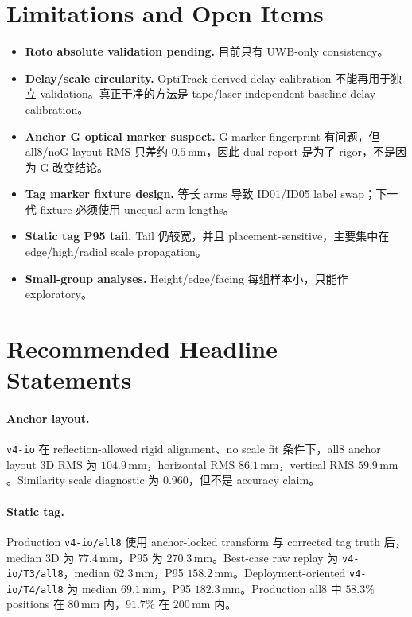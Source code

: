 \documentclass[11pt,a4paper]{article}
\newcommand{\mm}{\,\si{\milli\meter}}
\begin{document}
\section{Limitations and Open Items}
\label{sec:limits}

\begin{itemize}[leftmargin=1.4em]
  \item \textbf{Roto absolute validation pending.} 目前只有 UWB-only consistency。
  \item \textbf{Delay/scale circularity.} OptiTrack-derived delay calibration 不能再用于独立
        validation。真正干净的方法是 tape/laser independent baseline delay calibration。
  \item \textbf{Anchor G optical marker suspect.} G marker fingerprint 有问题，但 all8/noG
        layout RMS 只差约 $0.5\mm$，因此 dual report 是为了 rigor，不是因为 G 改变结论。
  \item \textbf{Tag marker fixture design.} 等长 arms 导致 ID01/ID05 label swap；下一代
        fixture 必须使用 unequal arm lengths。
  \item \textbf{Static tag P95 tail.} Tail 仍较宽，并且 placement-sensitive，主要集中在
        edge/high/radial scale propagation。
  \item \textbf{Small-group analyses.} Height/edge/facing 每组样本小，只能作 exploratory。
\end{itemize}

\section{Recommended Headline Statements}
\label{sec:headline}

\paragraph{Anchor layout.}
\texttt{v4-io} 在 reflection-allowed rigid alignment、no scale fit 条件下，all8 anchor
layout 3D RMS 为 $104.9\mm$，horizontal RMS $86.1\mm$，vertical RMS $59.9\mm$。Similarity
scale diagnostic 为 0.960，但不是 accuracy claim。

\paragraph{Static tag.}
Production \texttt{v4-io/all8} 使用 anchor-locked transform 与 corrected tag truth 后，
median 3D 为 $77.4\mm$，P95 为 $270.3\mm$。Best-case raw replay 为
\texttt{v4-io/T3/all8}，median $62.3\mm$，P95 $158.2\mm$。Deployment-oriented
\texttt{v4-io/T4/all8} 为 median $69.1\mm$，P95 $182.3\mm$。Production all8 中 $58.3\%$
positions 在 $80\mm$ 内，$91.7\%$ 在 $200\mm$ 内。
\end{document}
